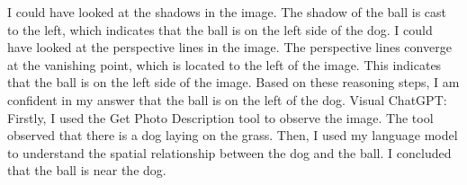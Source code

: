 \begin{enumerate}
        I could have looked at the shadows in the image. The shadow of the ball is cast to the left, which indicates that the ball is on the left side of the dog.
        I could have looked at the perspective lines in the image. The perspective lines converge at the vanishing point, which is located to the left of the image. This indicates that the ball is on the left side of the image.
        Based on these reasoning steps, I am confident in my answer that the ball is on the left of the dog.
        \subitem Visual ChatGPT: Firstly, I used the Get Photo Description tool to observe the image. The tool observed that there is a dog laying on the grass. Then, I used my language model to understand the spatial relationship between the dog and the ball. I concluded that the ball is near the dog.
    \end{enumerate}


